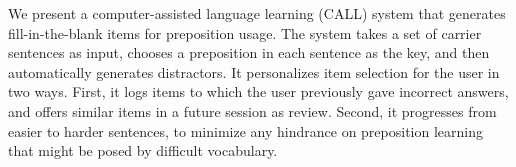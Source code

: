 We present a computer-assisted language learning (CALL) system that generates fill-in-the-blank items for preposition usage.                          The system takes a set of carrier sentences as input, chooses a preposition in each sentence as the key, and then automatically generates distractors.  It personalizes item selection for the user in two ways.  First, it logs items to which the user previously gave incorrect answers, and offers similar items in a future session as review. Second, it progresses from easier to harder sentences, to minimize any hindrance on preposition learning that might be posed by difficult vocabulary.
